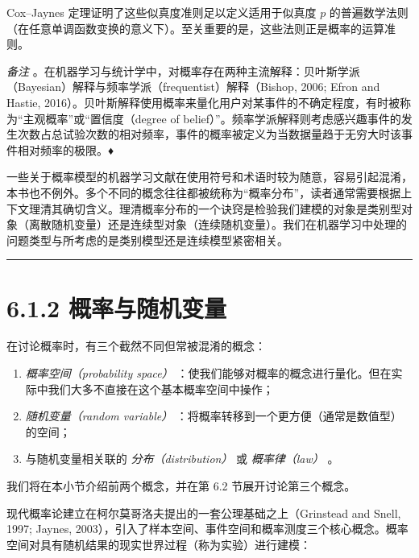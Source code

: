 Cox–Jaynes 定理证明了这些似真度准则足以定义适用于似真度 $ p $ 的普遍数学法则（在任意单调函数变换的意义下）。至关重要的是，这些法则正是概率的运算准则。

\emph{备注} 。在机器学习与统计学中，对概率存在两种主流解释：贝叶斯学派（Bayesian）解释与频率学派（frequentist）解释（Bishop, 2006; Efron and Hastie, 2016）。贝叶斯解释使用概率来量化用户对某事件的不确定程度，有时被称为“主观概率”或“置信度（degree of belief）”。频率学派解释则考虑感兴趣事件的发生次数占总试验次数的相对频率，事件的概率被定义为当数据量趋于无穷大时该事件相对频率的极限。♦

一些关于概率模型的机器学习文献在使用符号和术语时较为随意，容易引起混淆，本书也不例外。多个不同的概念往往都被统称为“概率分布”，读者通常需要根据上下文理清其确切含义。理清概率分布的一个诀窍是检验我们建模的对象是类别型对象（离散随机变量）还是连续型对象（连续随机变量）。我们在机器学习中处理的问题类型与所考虑的是类别模型还是连续模型紧密相关。

\medskip\hrule\medskip

\section*{6.1.2 概率与随机变量}

在讨论概率时，有三个截然不同但常被混淆的概念：

\begin{enumerate}
\item \emph{概率空间（probability space）} ：使我们能够对概率的概念进行量化。但在实际中我们大多不直接在这个基本概率空间中操作；
\item \emph{随机变量（random variable）} ：将概率转移到一个更方便（通常是数值型）的空间；
\item 与随机变量相关联的 \emph{分布（distribution）} 或 \emph{概率律（law）} 。
\end{enumerate}

我们将在本小节介绍前两个概念，并在第 6.2 节展开讨论第三个概念。

现代概率论建立在柯尔莫哥洛夫提出的一套公理基础之上（Grinstead and Snell, 1997; Jaynes, 2003），引入了样本空间、事件空间和概率测度三个核心概念。概率空间对具有随机结果的现实世界过程（称为实验）进行建模：

